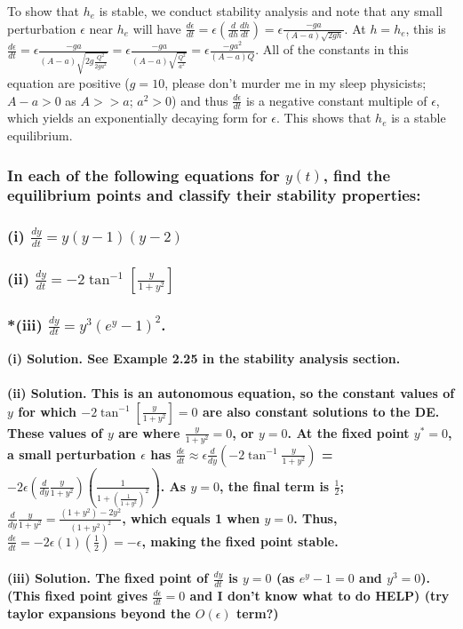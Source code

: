 \documentclass{article}
\begin{document}
To show that $h_e$ is stable, we conduct stability analysis and note that any small perturbation $\epsilon$ near $h_e$ will have $\frac{d\epsilon}{dt} = \epsilon (\frac{d}{dh}\frac{dh}{dt}) = \epsilon\frac{-ga}{(A-a)\sqrt{2gh}}$. At $h = h_e$, this is $\frac{d\epsilon}{dt} = \epsilon\frac{-ga}{(A-a)\sqrt{2g \frac{Q^2}{2ga^2}}} = \epsilon\frac{-ga}{(A-a)\sqrt{\frac{Q^2}{a^2}}} = \epsilon\frac{-ga^2}{(A-a)Q}$. All of the constants in this equation are positive ($g = 10$, please don't murder me in my sleep physicists; $A-a > 0$ as $A >> a$; $a^2 > 0$) and thus $\frac{d\epsilon}{dt}$ is a negative constant multiple of $\epsilon$, which yields an exponentially decaying form for $\epsilon$. This shows that $h_e$ is a stable equilibrium.

\hrulefill

\subsubsection*{In each of the following equations for $y(t)$, find the equilibrium points and classify their stability properties: \\ \\
(i) $\frac{dy}{dt} = y(y-1)(y-2)$ \\ \\
(ii) $\frac{dy}{dt} = -2\tan^{-1}[\frac{y}{1+y^2}]$ \\ \\
*(iii) $\frac{dy}{dt} = y^3(e^y-1)^2$.
}
\bf (i) Solution. \normalfont See Example 2.25 in the stability analysis section. \\ \\
\bf (ii) Solution. \normalfont This is an autonomous equation, so the constant values of $y$ for which $-2\tan^{-1}[\frac{y}{1+y^2}] = 0$ are also constant solutions to the DE. These values of $y$ are where $\frac{y}{1+y^2} = 0$, or $y = 0$. At the fixed point $y^* = 0$, a small perturbation $\epsilon$ has $\frac{d\epsilon}{dt} \approx \epsilon \frac{d}{dy}(-2\tan^{-1}\frac{y}{1+y^2})$
= $-2\epsilon(\frac{d}{dy} \frac{y}{1+y^2})(\frac{1}{1+(\frac{1}{1+y^2})^2})$. As $y=0$, the final term is $\frac{1}{2}$; $\frac{d}{dy}\frac{y}{1+y^2} = \frac{(1+y^2)-2y^2}{(1+y^2)^2}$, which equals 1 when $y=0$. Thus, $\frac{d\epsilon}{dt} = -2\epsilon(1)(\frac{1}{2}) = -\epsilon$, making the fixed point stable. \\ \\
\bf (iii) Solution. \normalfont The fixed point of $\frac{dy}{dt}$ is $y=0$ (as $e^y-1 = 0$ and $y^3 = 0$). (This fixed point gives $\frac{d\epsilon}{dt} = 0$ and I don't know what to do HELP) (try taylor expansions beyond the $O(\epsilon)$ term?)
\end{document}
